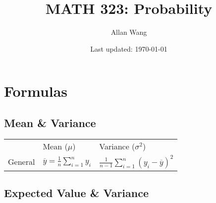 \documentclass[12pt]{article}
\author{Allan Wang}
\date{Last updated: \today}
\title{MATH 323: Probability}
\begin{document}
\onehalfspacing
\maketitle
\tableofcontents
\pagebreak

\section{Formulas}

\subsection{Mean \& Variance}

\begin{tabularx}{\textwidth}{l | X | X}
	& Mean ($\mu$) & Variance ($\sigma^2$) \\
	General & $\overline{y} = \frac{1}{n} \sum_{i = 1}^n y_i$ & $\frac{1}{n - 1} \sum_{i = 1}^n (y_i - \overline{y})^2$
\end{tabularx}

\subsection{Expected Value \& Variance}
\end{document}
